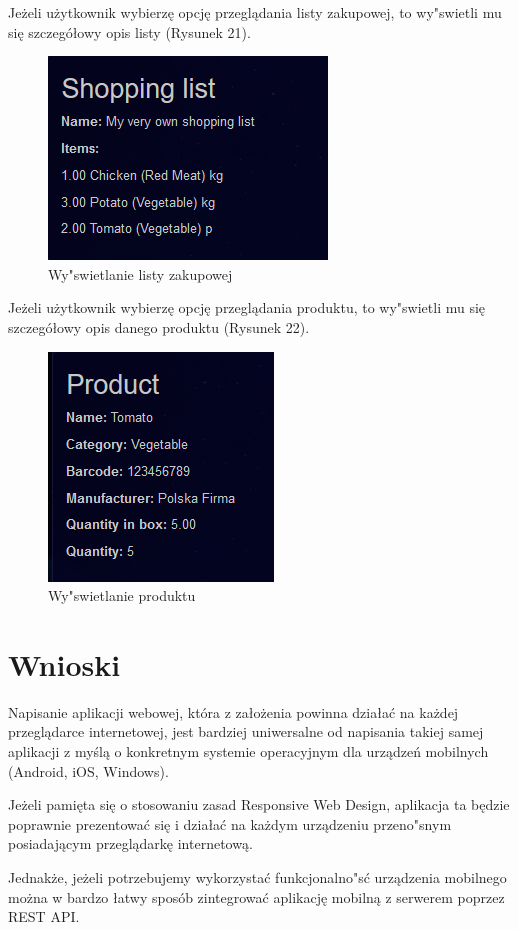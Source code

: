 \documentclass{article}
\begin{document}
Jeżeli użytkownik wybierzę opcję przeglądania listy zakupowej, to wy"swietli mu się szczegółowy opis listy (Rysunek 21).
\begin{figure}[!ht]
  \centering
    \includegraphics[]{reshp12}\par\vspace{1cm}
  \caption{Wy"swietlanie listy zakupowej}
\end{figure}
\newpage
Jeżeli użytkownik wybierzę opcję przeglądania produktu, to wy"swietli mu się szczegółowy opis danego produktu (Rysunek 22).
\begin{figure}[!ht]
  \centering
    \includegraphics[]{reshp13}\par\vspace{1cm}
  \caption{Wy"swietlanie produktu}
\end{figure}

\section{Wnioski}
Napisanie aplikacji webowej, która z założenia powinna działać na każdej przeglądarce internetowej, jest bardziej uniwersalne od napisania takiej samej aplikacji z myślą o konkretnym systemie operacyjnym dla urządzeń mobilnych (Android, iOS, Windows). \par
Jeżeli pamięta się o stosowaniu zasad Responsive Web Design, aplikacja ta będzie poprawnie prezentować się i działać na każdym urządzeniu przeno"snym posiadającym przeglądarkę internetową. \par
Jednakże, jeżeli potrzebujemy wykorzystać funkcjonalno"sć urządzenia mobilnego można w bardzo łatwy sposób zintegrować aplikację mobilną z serwerem poprzez REST API.
\end{document}
